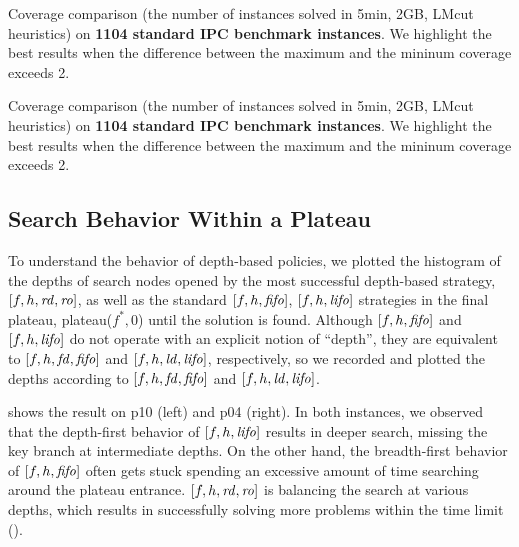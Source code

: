 \begin{table}[htbp]
 {
 \centering
 
 \caption{
 Coverage comparison (the number of instances solved in 5min, 2GB, LMcut
 heuristics) on \textbf{1104 standard IPC benchmark instances}. We highlight the
 best results when the difference between the maximum and the mininum coverage exceeds 2.
 }
 \label{tbl:lmcut-ipc-noh}
 }
\end{table}
\begin{table}[htbp]
 {
 \centering
 
 \caption{
 Coverage comparison (the number of instances solved in 5min, 2GB, LMcut
 heuristics) on \textbf{1104 standard IPC benchmark instances}. We highlight the
 best results when the difference between the maximum and the mininum coverage exceeds 2.
 }
 \label{tbl:mands-ipc-noh}
 }
\end{table}





\subsection{Search Behavior Within a Plateau}

To understand the behavior of depth-based policies, we plotted the histogram of
the depths of search nodes opened by
the most successful depth-based strategy, $[f,h,{\mbox{\textit{rd}}},{\mbox{\textit{ro}}}]$, as well as 
the standard $[f,h,{\mbox{\textit{fifo}}}]$, $[f,h,{\mbox{\textit{lifo}}}]$ strategies
in the final plateau, plateau($f^*,0$) until the solution is found.
% 
Although $[f,h,{\mbox{\textit{fifo}}}]$ and $[f,h,{\mbox{\textit{lifo}}}]$ do not operate with an explicit notion of ``depth'', 
they are equivalent to $[f,h,{\mbox{\textit{fd}}},{\mbox{\textit{fifo}}}]$ and $[f,h,{\mbox{\textit{ld}}},{\mbox{\textit{lifo}}}]$, respectively,
so we recorded and plotted the depths according to  $[f,h,{\mbox{\textit{fd}}},{\mbox{\textit{fifo}}}]$ and $[f,h,{\mbox{\textit{ld}}},{\mbox{\textit{lifo}}}]$.


 shows the result
on
  p10 (left) and
  p04 (right).
In both instances, 
we observed that the depth-first behavior of $[f,h,{\mbox{\textit{lifo}}}]$ results in 
deeper search, missing the key branch at intermediate depths.
On the other hand, the breadth-first behavior of $[f,h,{\mbox{\textit{fifo}}}]$ often gets stuck spending an excessive amount of time searching around the plateau entrance.
$[f,h,{\mbox{\textit{rd}}},{\mbox{\textit{ro}}}]$ is balancing the search at various depths, which results in successfully solving more problems within the time limit (). %

